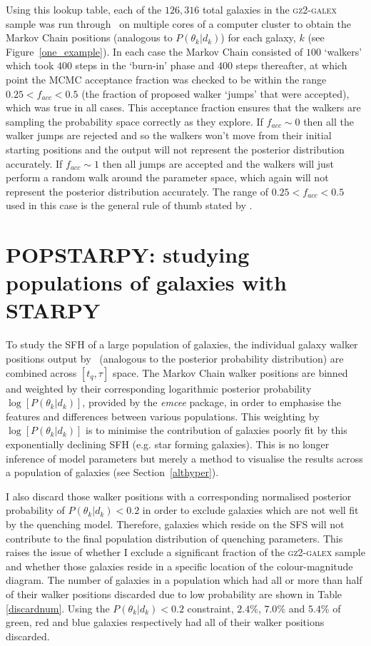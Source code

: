 Using this lookup table, each of the $126,316$ total galaxies in the \textsc{gz2-galex} sample was run through \starpy ~on multiple cores of a computer cluster to obtain the Markov Chain positions (analogous to $P(\theta_k|d_k)$) for each galaxy, $k$ (see Figure~\ref{one_example}). In each case the Markov Chain consisted of $100$ `walkers' which took $400$ steps in the `burn-in' phase and $400$ steps thereafter, at which point the MCMC acceptance fraction was checked to be within the range $0.25 < f_{acc} < 0.5$ (the fraction of proposed walker `jumps' that were accepted), which was true in all cases. This acceptance fraction ensures that the walkers are sampling the probability space correctly as they explore. If $f_{acc} \sim 0$ then all the walker jumps are rejected and so the walkers won't move from their initial starting positions and the output will not represent the posterior distribution accurately. If $f_{acc} \sim 1$ then all jumps are accepted and the walkers will just perform a random walk around the parameter space, which again will not represent the posterior distribution accurately. The range of $0.25 < f_{acc} < 0.5$ used in this case is the general rule of thumb stated by \citet*{gelman96}.


\section{POPSTARPY: studying populations of galaxies with STARPY}\label{popstarpy}

To study the SFH of a large population of galaxies, the individual galaxy walker positions output by \starpy ~(analogous to the posterior probability distribution) are combined across $[t_q, \tau]$ space. The Markov Chain walker positions are binned and weighted by their corresponding logarithmic posterior probability $\log [P(\theta_k|d_k)]$, provided by the \emph{emcee} package, in order to emphasise the features and differences between various populations. This weighting by $\log [P(\theta_k|d_k)]$ is to minimise the contribution of galaxies poorly fit by this exponentially declining SFH (e.g. star forming galaxies). This is no longer inference of model parameters but merely a method to visualise the results across a population of galaxies (see Section~\ref{althyper}).

I also discard those walker positions with a corresponding normalised posterior probability of $P(\theta_k|d_k) < 0.2$ in order to exclude galaxies which are not well fit by the quenching model. Therefore, galaxies which reside on the SFS will not contribute to the final population distribution of quenching parameters. This raises the issue of whether I exclude a significant fraction of the \textsc{gz2-galex} sample and whether those galaxies reside in a specific location of the colour-magnitude diagram. The number of galaxies in a population which had all or more than half of their walker positions discarded due to low probability are shown in Table \ref{discardnum}. Using the $P(\theta_k|d_k) < 0.2$ constraint, $2.4\%$, $7.0\%$ and $5.4\%$ of green, red and blue galaxies respectively had all of their walker positions discarded. 

